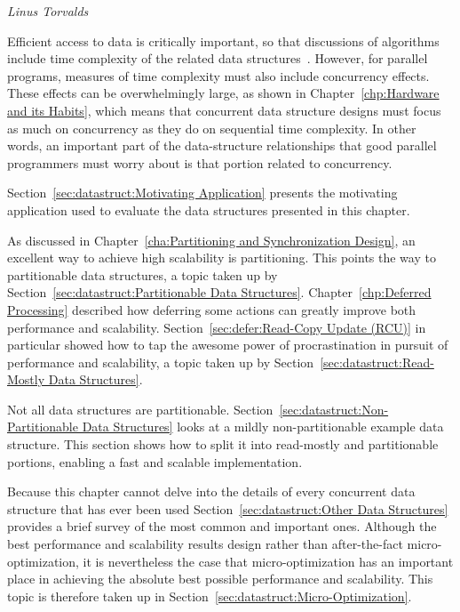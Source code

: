 
%
	 {\emph{Linus Torvalds}}

Efficient access to data is critically important, so that
discussions of algorithms include time complexity of the related
data structures~\cite{ThomasHCorman2001Algorithms}.
However, for parallel programs, measures of time complexity must also
include concurrency effects.
These effects can be overwhelmingly large, as shown in
Chapter~\ref{chp:Hardware and its Habits}, which means that
concurrent data structure designs must focus as much on
concurrency as they do on sequential time complexity.
In other words, an important part of the data-structure relationships
that good parallel programmers must worry about is that portion
related to concurrency.

Section~\ref{sec:datastruct:Motivating Application}
presents the motivating application used to evaluate
the data structures presented in this chapter.

As discussed in Chapter~\ref{cha:Partitioning and Synchronization Design},
an excellent way to achieve high scalability is partitioning.
This points the way to partitionable data structures, a topic taken up by
Section~\ref{sec:datastruct:Partitionable Data Structures}.
Chapter~\ref{chp:Deferred Processing} described how deferring some
actions can greatly improve both performance and scalability.
Section~\ref{sec:defer:Read-Copy Update (RCU)} in particular showed
how to tap the awesome power of procrastination in pursuit of
performance and scalability, a topic taken up by
Section~\ref{sec:datastruct:Read-Mostly Data Structures}.

Not all data structures are partitionable.
Section~\ref{sec:datastruct:Non-Partitionable Data Structures}
looks at a mildly non-partitionable example data structure.
This section shows
how to split it into read-mostly and partitionable portions,
enabling a fast and scalable implementation.

Because this chapter cannot delve into the details of every concurrent
data structure that has ever been used
Section~\ref{sec:datastruct:Other Data Structures}
provides a brief survey of the most common and important ones.
Although the best performance and scalability results design rather
than after-the-fact micro-optimization, it is nevertheless the case
that micro-optimization has an important place in achieving the
absolute best possible performance and scalability.
This topic is therefore taken up in
Section~\ref{sec:datastruct:Micro-Optimization}.

